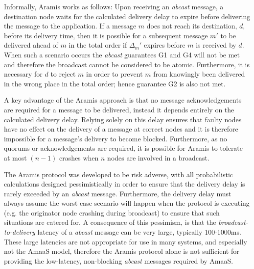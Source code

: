     Informally, \textsf{Aramis} works as follows:  Upon receiving an \emph{abcast} message, a destination node waits for the calculated delivery delay to expire before delivering the message to the application.  If a message $m$ does not reach its destination, $d$, before its delivery time, then it is possible for a subsequent message $m'$ to be delivered ahead of $m$ in the total order if $\Delta_m'$ expires before $m$ is received by $d$.  When such a scenario occurs the \emph{abcast} guarantees G1 and G4 will not be met and therefore the broadcast cannot be considered to be atomic.  Furthermore, it is necessary for $d$ to reject $m$ in order to prevent $m$ from knowingly been delivered in the wrong place in the total order; hence guarantee G2 is also not met.  
    
    A key advantage of the \textsf{Aramis} approach is that no message acknowledgements are required for a message to be delivered, instead it depends entirely on the calculated delivery delay.  Relying solely on this delay ensures that faulty nodes have no effect on the delivery of a message at correct nodes and it is therefore impossible for a message's delivery to become blocked.  Furthermore, as no quorums or acknowledgements are required, it is possible for  \textsf{Aramis} to tolerate at most $(n - 1)$ crashes when $n$ nodes are involved in a broadcast.  
    
    The \textsf{Aramis} protocol was developed to be risk adverse, with all probabilistic calculations designed pessimistically in order to ensure that the delivery delay is rarely exceeded by an \emph{abcast} message.  Furthermore, the delivery delay must always assume the worst case scenario will happen when the protocol is executing (e.g. the originator node crashing during broadcast) to ensure that such situations are catered for.  A consequence of this pessimism, is that the \emph{broadcast-to-delivery} latency of a \emph{abcast} message can be very large, typically 100-1000ms.  These large latencies are not appropriate for use in many systems, and especially not the \textsf{AmaaS} model, therefore the \textsf{Aramis} protocol alone is not sufficient for providing the low-latency, non-blocking \emph{abcast} messages required by \textsf{AmaaS}.   
    
